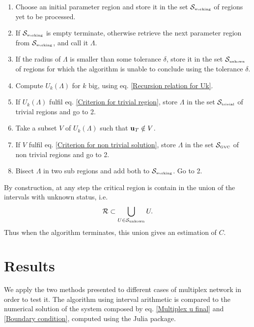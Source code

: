 \documentclass[
11pt, %
english, %
singlespacing, %
nolistspacing, %
liststotoc, %
headsepline, %
]{MastersDoctoralThesis} %
\begin{document}
\begin{enumerate}
	\item Choose an initial parameter region and store it in the set $\mathcal{S}_{\text{\tiny working}}$ of regions yet to be processed.
	\item If $\mathcal{S}_{\text{\tiny working}}$ is empty terminate, otherwise retrieve the next parameter region from $\mathcal{S}_{\text{\tiny working}}$, and call it $\Lambda$.
	\item If the radius of $\Lambda$ is smaller than some tolerance $\delta$, store it in the set $\mathcal{S}_{\text{\tiny unkown}}$ of regions for which the algorithm is unable to conclude using the tolerance $\delta$.
	\item Compute $U_k(\Lambda)$ for $k$ big, using eq. \eqref{Recursion relation for Uk}.
	\item If $U_k(\Lambda)$ fulfil eq. \eqref{Criterion for trivial region}, store $\Lambda$ in the set $\mathcal{S}_{\text{\tiny trivial}}$ of trivial regions and go to 2.
	\item Take a subset $V$ of $U_k(\Lambda)$ such that $\boldsymbol{\mathrm{u}}_T \notin V$.
	\item If $V$ fulfil eq. \eqref{Criterion for non trivial solution}, store $\Lambda$ in the set $\mathcal{S}_{\text{\tiny GVC}}$ of non trivial regions and go to 2.
	\item Bisect $\Lambda$ in two sub regions and add both to $\mathcal{S}_{\text{\tiny working}}$. Go to 2.
\end{enumerate}

By construction, at any step the critical region is contain in the union of the intervals with unknown status, i.e.
\begin{align}
	\mathcal{R} \subset \bigcup_{U \in \mathcal{S}_{\text{\tiny unkown}}} U.
\end{align}
Thus when the algorithm terminates, this union gives an estimation of $C$.

\section{Results}

We apply the two methods presented to different cases of multiplex network in order to test it. The algorithm using interval arithmetic is compared to the numerical solution of the system composed by eq. \eqref{Multiplex u final} and \eqref{Boundary condition}, computed using the  Julia package.

\end{document}
